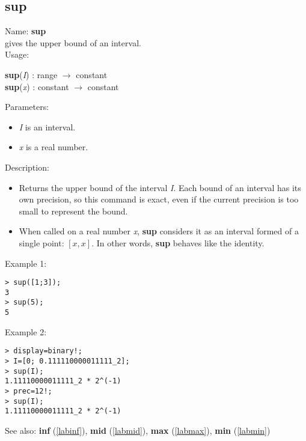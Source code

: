 \subsection{sup}
\label{labsup}
\noindent Name: \textbf{sup}\\
gives the upper bound of an interval.\\
\noindent Usage: 
\begin{center}
\textbf{sup}(\emph{I}) : \textsf{range} $\rightarrow$ \textsf{constant}\\
\textbf{sup}(\emph{x}) : \textsf{constant} $\rightarrow$ \textsf{constant}\\
\end{center}
Parameters: 
\begin{itemize}
\item \emph{I} is an interval.
\item \emph{x} is a real number.
\end{itemize}
\noindent Description: \begin{itemize}

\item Returns the upper bound of the interval \emph{I}. Each bound of an interval has its 
   own precision, so this command is exact, even if the current precision is too 
   small to represent the bound.

\item When called on a real number \emph{x}, \textbf{sup} considers it as an interval formed
   of a single point: $\left[ x, x \right]$. In other words, \textbf{sup} behaves like the identity.
\end{itemize}
\noindent Example 1: 
\begin{center}\begin{minipage}{15cm}\begin{Verbatim}[frame=single]
> sup([1;3]);
3
> sup(5);
5
\end{Verbatim}
\end{minipage}\end{center}
\noindent Example 2: 
\begin{center}\begin{minipage}{15cm}\begin{Verbatim}[frame=single]
> display=binary!;
> I=[0; 0.111110000011111_2];
> sup(I);
1.11110000011111_2 * 2^(-1)
> prec=12!;
> sup(I);
1.11110000011111_2 * 2^(-1)
\end{Verbatim}
\end{minipage}\end{center}
See also: \textbf{inf} (\ref{labinf}), \textbf{mid} (\ref{labmid}), \textbf{max} (\ref{labmax}), \textbf{min} (\ref{labmin})
